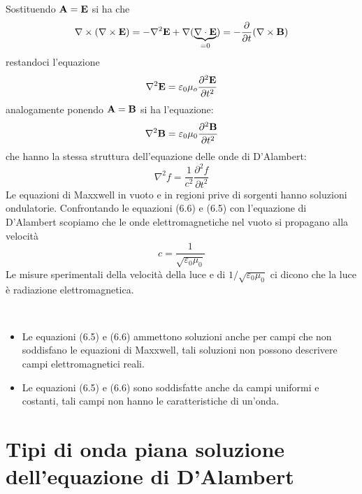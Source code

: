 Sostituendo $\bold{A} = \bold{E}$ si ha che 
\begin{equation*}
	\nabla \times (\nabla \times \bold{E}) = - \nabla^2 \bold{E} + \nabla (\underbrace{\nabla \cdot \bold{E}}_{=0}) = - \frac{\partial }{\partial t}(\nabla \times \bold{B})
\end{equation*}
restandoci l'equazione
\begin{equation}
	\nabla^2 \bold{E} = \varepsilon_0 \mu_o\frac{\partial^2 \bold{E}}{\partial t^2}
\end{equation}
analogamente ponendo $\bold{A} = \bold{B}$ si ha l'equazione:
\begin{equation}
	\nabla^2 \bold{B} = \varepsilon_0 \mu_0 \frac{\partial^2 \bold{B}}{\partial t^2}
\end{equation}
che hanno la stessa struttura dell'equazione delle onde di D'Alambert:
\begin{equation*}
	\nabla^2f = \frac{1}{c^2} \frac{\partial ^2f}{\partial t^2}
\end{equation*}
Le equazioni di Maxxwell in vuoto e in regioni prive di sorgenti hanno soluzioni ondulatorie. Confrontando le equazioni (6.6) e (6.5) con l'equazione di D'Alambert scopiamo che le onde elettromagnetiche nel vuoto si propagano alla velocit\`a 
\begin{equation*}
	c = \frac{1}{\sqrt{\varepsilon_0 \mu_0}}
\end{equation*}
Le misure sperimentali della velocit\`a della luce e di $1/\sqrt{\varepsilon_0 \mu_0}$ ci dicono che la luce \`e radiazione elettromagnetica.
\begin{remark}
\
\begin{itemize}
	\item Le equazioni (6.5) e (6.6)  ammettono soluzioni anche per campi che non soddisfano le equazioni di Maxxwell, tali soluzioni non possono descrivere campi elettromagnetici reali.
	\item Le equazioni (6.5) e (6.6) sono soddisfatte anche da campi uniformi e costanti, tali campi non hanno le caratteristiche di un'onda.
\end{itemize}	
\end{remark}
\section{Tipi di onda piana  soluzione dell'equazione di D'Alambert}
